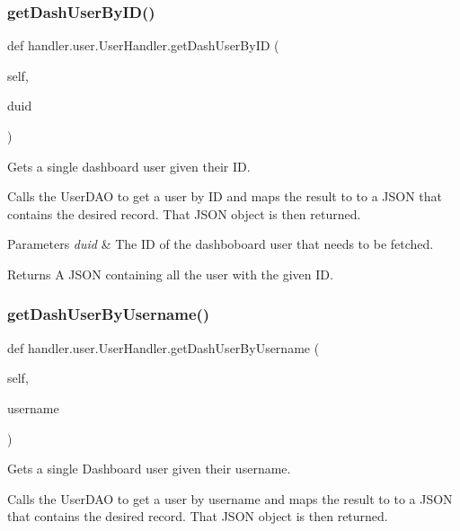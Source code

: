 \subsubsection{\texorpdfstring{get\+Dash\+User\+By\+I\+D()}{getDashUserByID()}}
{\footnotesize\ttfamily def handler.\+user.\+User\+Handler.\+get\+Dash\+User\+By\+ID (\begin{DoxyParamCaption}\item[{}]{self,  }\item[{}]{duid }\end{DoxyParamCaption})}



Gets a single dashboard user given their ID. 

Calls the User\+D\+AO to get a user by ID and maps the result to to a J\+S\+ON that contains the desired record. That J\+S\+ON object is then returned.


\begin{DoxyParams}{Parameters}
{\em duid} & The ID of the dashboboard user that needs to be fetched.\\
\hline
\end{DoxyParams}
\begin{DoxyReturn}{Returns}
A J\+S\+ON containing all the user with the given ID. 
\end{DoxyReturn}
\mbox{\label{classhandler_1_1user_1_1_user_handler_a70ef6b477b3320b72ffdd736df0f0f96}} 
\subsubsection{\texorpdfstring{get\+Dash\+User\+By\+Username()}{getDashUserByUsername()}}
{\footnotesize\ttfamily def handler.\+user.\+User\+Handler.\+get\+Dash\+User\+By\+Username (\begin{DoxyParamCaption}\item[{}]{self,  }\item[{}]{username }\end{DoxyParamCaption})}



Gets a single Dashboard user given their username. 

Calls the User\+D\+AO to get a user by username and maps the result to to a J\+S\+ON that contains the desired record. That J\+S\+ON object is then returned.


